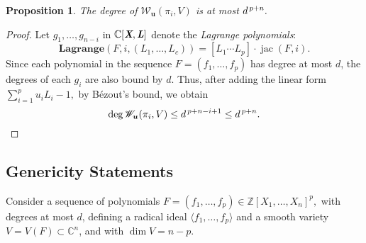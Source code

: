 \documentclass[a4paper]{article}
\def\Lb{\textit{\textbf{L}}}
\def\Xb{\textit{\textbf{X}}}
\def\ub{{\bm u}}
\DeclareMathOperator{\jac}{jac}
\newcommand{\ZZ}{{\mathbb{Z}}}
\def\C{\mathbb{C}}
\def\lagF{{\bm{Lagrange}}(F,i,(L_1,\hdots,L_c))}
\def\Wil{\mathscr{W}_{\ub}(\pi_i,V)}
\newtheorem{prop}[theorem]{Proposition}
\begin{document}
%
%
%
\vspace{2mm}
\begin{prop}
The degree of $\Wil$ is at most $d^{\hspace{.5mm}p+n}.$
\end{prop}
\begin{proof}
Let $g_1,\hdots,g_{n-i}$ in $\C[\Xb,\Lb]$ denote the \textit{Lagrange polynomials}:
\[
\lagF = [L_1 \cdots L_p]\cdot \jac (F,i).
\]
Since each polynomial in the sequence $F=(f_1,\hdots,f_p)$ has degree at most $d$, the degrees of each $g_i$ are also bound by $d.$  Thus, after adding the linear form $\sum_{i=1}^pu_iL_i-1,$ by B\'ezout's bound, we obtain
\[
\deg \Wil \leq d^{\hspace{.5mm}p+n-i+1} \leq d^{\hspace{.5mm}p+n}. 
\]
\end{proof}
%







\subsection{Genericity Statements}\label{sec:gen}
Consider a sequence of polynomials $F= (f_1,\hdots,f_p) \in \ZZ[X_1,\hdots,X_n]^p,$ with degrees at most $d$, defining a radical ideal $\langle f_1,\hdots, f_p \rangle $ and a smooth variety $V=V(F) \subset \C^n$, and with $\dim V = n-p$. %
%
%
\end{document}
